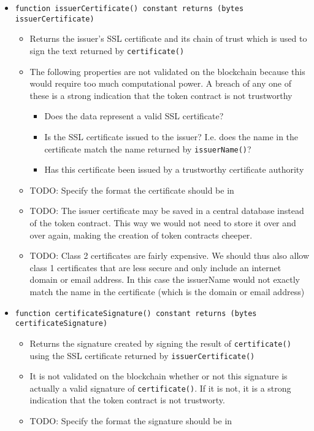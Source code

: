 \documentclass[a4paper]{article}
\newcommand{\todo}[1]{\textsf{TODO: #1}}
\begin{document}
\begin{itemize}
  \item \texttt{function issuerCertificate() constant returns (bytes issuerCertificate)}
  \begin{itemize}
    \item Returns the issuer's SSL certificate and its chain of trust which is used to sign the text returned by \texttt{certificate()}
    \item The following properties are not validated on the blockchain because this would require too much computational power. A breach of any one of these is a strong indication that the token contract is not trustworthy
    \begin{itemize}
      \item Does the data represent a valid SSL certificate?
      \item Is the SSL certificate issued to the issuer? I.e. does the name in the certificate match the name returned by \texttt{issuerName()}?
      \item Has this certificate been issued by a trustworthy certificate authority
    \end{itemize}
    \item \todo{Specify the format the certificate should be in}
    \item \todo{The issuer certificate may be saved in a central database instead of the token contract. This way we would not need to store it over and over again, making the creation of token contracts cheeper.}
    \item \todo{Class 2 certificates are fairly expensive. We should thus also allow class 1 certificates that are less secure and only include an internet domain or email address. In this case the issuerName would not exactly match the name in the certificate (which is the domain or email address)}
  \end{itemize}
  
  \item \texttt{function certificateSignature() constant returns (bytes certificateSignature)}
  \begin{itemize}
    \item Returns the signature created by signing the result of \texttt{certificate()} using the SSL certificate returned by \texttt{issuerCertificate()}
    \item It is not validated on the blockchain whether or not this signature is actually a valid signature of \texttt{certificate()}. If it is not, it is a strong indication that the token contract is not trustworty.
    \item \todo{Specify the format the signature should be in}
  \end{itemize}
\end{itemize}
\end{document}
